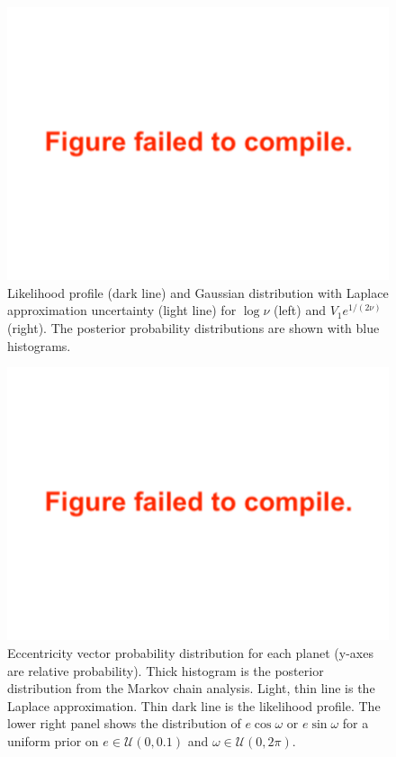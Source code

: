 \documentclass[twocolumn]{aastex63}
\begin{document}
\begin{figure}
    \centering
    \includegraphics[width=\columnwidth]{figures/T1_students_params_transformed.pdf}
    {Likelihood profile (dark line) and Gaussian distribution
        with Laplace approximation uncertainty (light line) for $\log{\nu}$ (left) and
        $V_1 e^{1/(2\nu)}$ (right).  The posterior probability distributions are shown with blue histograms.}
    \label{fig:student_param_likelihood_profile}
\end{figure}

\begin{figure}
    \centering
    \includegraphics[width=\hsize]{figures/T1_eccentricity_vectors_likelihood_profile_hmc.pdf}
    {Eccentricity vector probability distribution for each planet (y-axes are relative probability).  Thick histogram is the posterior distribution from the Markov chain analysis.  Light, thin line is the Laplace approximation.  Thin dark line is the likelihood profile.  The lower right panel shows the distribution of
        $e\cos{\omega}$ or $e\sin{\omega}$ for a uniform prior on
        $e \in \mathcal{U}(0,0.1)$ and $\omega \in \mathcal{U}(0,2\pi)$.}
    \label{fig:ecc_likelihood_profile}
\end{figure}
\end{document}
